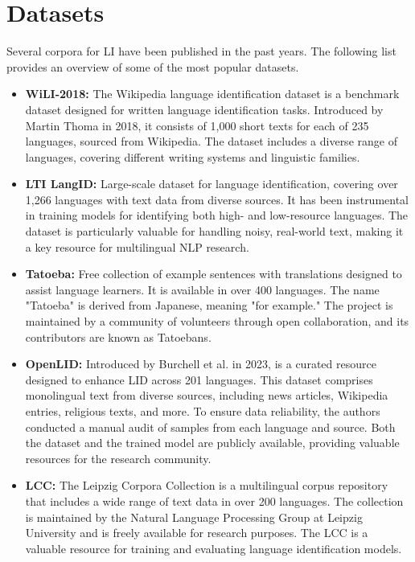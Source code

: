 \section{Datasets}\label{sec:datasets}
Several corpora for LI have been published in the past years. The following list provides an overview of some of the most popular datasets.

\begin{itemize}
    \item \textbf{WiLI-2018:} The Wikipedia language identification dataset is a benchmark dataset designed for written language identification tasks. Introduced by Martin Thoma in 2018, it consists of 1,000 short texts for each of 235 languages, sourced from Wikipedia. The dataset includes a diverse range of languages, covering different writing systems and linguistic families. \cite{Thoma2018}
    \item \textbf{LTI LangID:} Large-scale dataset for language identification, covering over 1,266 languages with text data from diverse sources. It has been instrumental in training models for identifying both high- and low-resource languages. The dataset is particularly valuable for handling noisy, real-world text, making it a key resource for multilingual NLP research. \cite{Caswell2020}
    \item \textbf{Tatoeba:} Free collection of example sentences with translations designed to assist language learners. It is available in over 400 languages. The name "Tatoeba" is derived from Japanese, meaning "for example." The project is maintained by a community of volunteers through open collaboration, and its contributors are known as Tatoebans. \cite{Tatoeba2025}
    \item \textbf{OpenLID:} Introduced by Burchell et al. in 2023, is a curated resource designed to enhance LID across 201 languages. This dataset comprises monolingual text from diverse sources, including news articles, Wikipedia entries, religious texts, and more. To ensure data reliability, the authors conducted a manual audit of samples from each language and source. Both the dataset and the trained model are publicly available, providing valuable resources for the research community. \cite{Burchell2023}
    \item \textbf{LCC:} The Leipzig Corpora Collection is a multilingual corpus repository that includes a wide range of text data in over 200 languages. The collection is maintained by the Natural Language Processing Group at Leipzig University and is freely available for research purposes. The LCC is a valuable resource for training and evaluating language identification models. \cite{Goldhahn2012}
\end{itemize}

